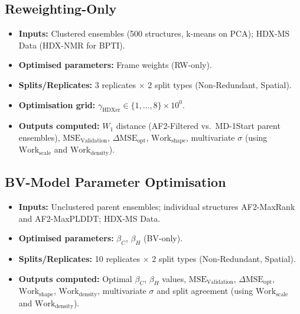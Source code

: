 \subsection{Reweighting-Only}
\label{app:valdx-case-rw}
\begin{itemize}
    \item \textbf{Inputs:} Clustered ensembles (500 structures, k-means on PCA); HDX-MS Data (HDX-NMR for BPTI).
    \item \textbf{Optimised parameters:} Frame weights (RW-only).
    \item \textbf{Splits/Replicates:} 3 replicates $\times$ 2 split types (Non-Redundant, Spatial).
    \item \textbf{Optimisation grid:} $\gamma_\text{HDXer} \in \{1, \dots, 8\} \times 10^{0}$.
    \item \textbf{Outputs computed:} $W_1$ distance (AF2-Filtered vs.\ MD-1Start parent ensembles), $\text{MSE}_\text{Validation}$, $\Delta \text{MSE}_\text{opt}$, $\text{Work}_\text{shape}$, multivariate $\sigma$ (using $\text{Work}_\text{scale}$ and $\text{Work}_\text{density}$).
\end{itemize}

\subsection{BV-Model Parameter Optimisation}
\label{app:valdx-case-bv}
\begin{itemize}
    \item \textbf{Inputs:} Unclustered parent ensembles; individual structures AF2-MaxRank and AF2-MaxPLDDT; HDX-MS Data.
    \item \textbf{Optimised parameters:} $\beta_C$, $\beta_H$ (BV-only).
    \item \textbf{Splits/Replicates:} 10 replicates $\times$ 2 split types (Non-Redundant, Spatial).
    \item \textbf{Outputs computed:} Optimal $\beta_C$, $\beta_H$ values, $\text{MSE}_\text{Validation}$, $\Delta\text{MSE}_\text{opt}$, $\text{Work}_\text{shape}$, $\text{Work}_\text{density}$, multivariate $\sigma$ and split agreement (using $\text{Work}_\text{scale}$ and $\text{Work}_\text{density}$).
\end{itemize}

